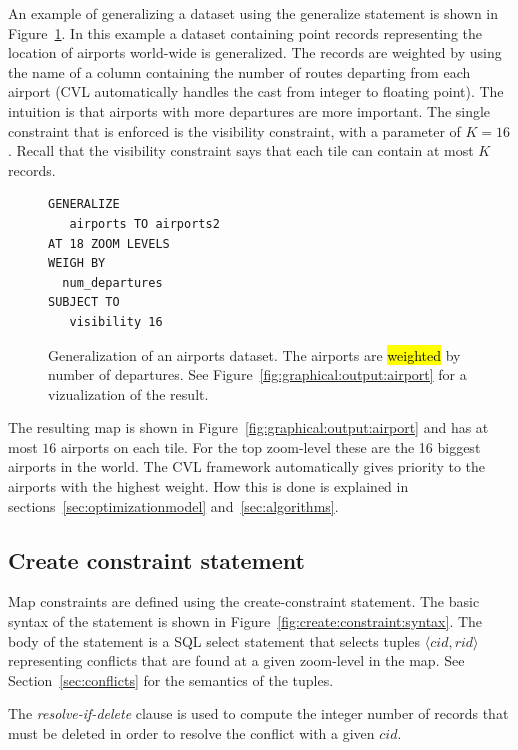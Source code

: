 An example of generalizing a dataset using the generalize statement is shown in Figure~\ref{fig:cvl:example:airports}. In this example a dataset containing point records representing the location of airports world-wide is generalized. The records are weighted by using the name of a column containing the number of routes departing from each airport (CVL automatically handles the cast from integer to floating point). The intuition is that airports with more departures are more important. The single constraint that is enforced is the visibility constraint, with a parameter of $K=16$. Recall that the visibility constraint says that each tile can contain at most $K$ records.

\begin{figure}[htbp]
\begin{center}
\begin{lstlisting}
GENERALIZE 
   airports TO airports2
AT 18 ZOOM LEVELS
WEIGH BY
  num_departures
SUBJECT TO 
   visibility 16 
\end{lstlisting}
\caption{Generalization of an airports dataset. The airports are \hl{weighted} by number of departures. See Figure~\ref{fig:graphical:output:airport} for a vizualization of the result.}
\label{fig:cvl:example:airports}
\end{center}
\end{figure}

The resulting map is shown in Figure~\ref{fig:graphical:output:airport} and has at most $16$ airports on each tile. For the top zoom-level these are the 16 biggest airports in the world. The CVL framework automatically gives priority to the airports with the highest weight. How this is done is explained in sections~\ref{sec:optimizationmodel} and~\ref{sec:algorithms}.

\subsection{Create constraint statement}
\label{sec:create:constraint:statement}

Map constraints are defined using the create-constraint statement.  The basic syntax of the statement is shown in Figure~\ref{fig:create:constraint:syntax}. The body of the statement is a SQL select statement that selects tuples $\langle cid, rid\rangle$ representing conflicts that are found at a given zoom-level in the map. See Section~\ref{sec:conflicts} for the semantics of the tuples.

The \emph{resolve-if-delete} clause is used to compute the integer number of records that must be deleted in order to resolve the conflict with a given $cid$. 

